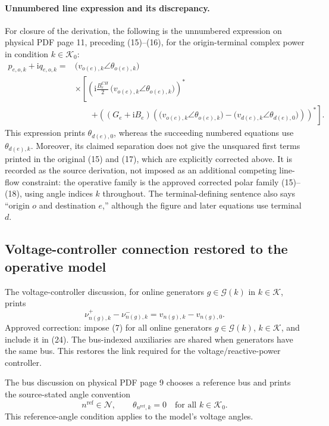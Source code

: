 \documentclass{article}
\begin{document}
\paragraph{Unnumbered line expression and its discrepancy.}
For closure of the derivation, the following is the unnumbered expression on physical PDF page 11, preceding (15)--(16), for the origin-terminal complex power in condition $k\in\mathcal K_0$:
\[
\begin{aligned}
p_{e,o,k}+\mathrm i q_{e,o,k}
={}&\bigl(v_{o(e),k}\angle\theta_{o(e),k}\bigr)\\
&\times\left[
\left(\mathrm i\frac{B_e^{CH}}2\,\bigl(v_{o(e),k}\angle\theta_{o(e),k}\bigr)\right)^*
\right.\\
&\qquad\left.+\left((G_e+\mathrm i B_e)
\left(\bigl(v_{o(e),k}\angle\theta_{o(e),k}\bigr)
-\bigl(v_{d(e),k}\angle\theta_{d(e),0}\bigr)\right)\right)^*
\right].
\end{aligned}
\]
This expression prints $\theta_{d(e),0}$, whereas the succeeding numbered equations use $\theta_{d(e),k}$. Moreover, its claimed separation does not give the unsquared first terms printed in the original (15) and (17), which are explicitly corrected above. It is recorded as the source derivation, not imposed as an additional competing line-flow constraint: the operative family is the approved corrected polar family (15)--(18), using angle indices $k$ throughout. The terminal-defining sentence also says ``origin $o$ and destination $e$,'' although the figure and later equations use terminal $d$.

\subsection*{Voltage-controller connection restored to the operative model}
The voltage-controller discussion, for online generators $g\in\mathcal G(k)$ in $k\in\mathcal K$, prints
\begin{equation}
\nu_{n(g),k}^{+}-\nu_{n(g),k}^{-}
=v_{n(g),k}-v_{n(g),0}.
\tag{7}
\end{equation}
Approved correction: impose (7) for all online generators $g\in\mathcal G(k)$, $k\in\mathcal K$, and include it in (24). The bus-indexed auxiliaries are shared when generators have the same bus. This restores the link required for the voltage/reactive-power controller.

The bus discussion on physical PDF page 9 chooses a reference bus and prints the source-stated angle convention
\[
n^{\mathrm{ref}}\in\mathcal N,\qquad
\theta_{n^{\mathrm{ref}},k}=0\quad\text{for all }k\in\mathcal K_0.
\]
This reference-angle condition applies to the model's voltage angles.
\end{document}
